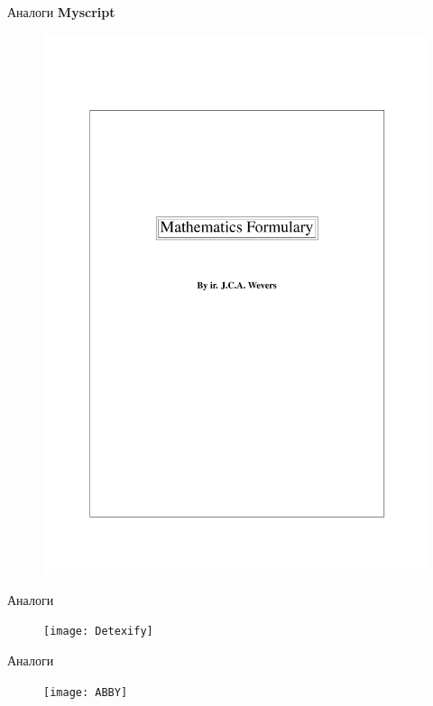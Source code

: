 \documentclass{beamer}
\begin{document}
\begin{frame}{Аналоги}
    \textbf{Myscript}
        \begin{figure}
            \centering
            \includegraphics[width=1\linewidth]{Math}
            \label{fig:math}
        \end{figure}
\end{frame}
\begin{frame}{Аналоги}
    \begin{figure}
        \centering
        \texttt{[image: Detexify]}
        \label{fig:math}
    \end{figure}
\end{frame}
\begin{frame}{Аналоги}
    \begin{figure}
        \centering
        \texttt{[image: ABBY]}
        \label{fig:math}
    \end{figure}
\end{frame}
\end{document}
